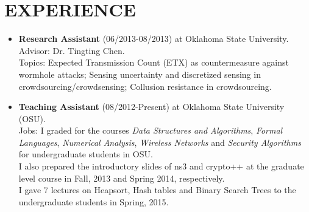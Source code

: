 \documentclass{article}
\begin{document}
\section{\uppercase{Experience}}
\begin{itemize}
\item {\bf Research Assistant} (06/2013-08/2013) at Oklahoma State University.\\
Advisor: Dr. Tingting Chen.\\
Topics: Expected Transmission Count (ETX) as countermeasure against wormhole attacks; Sensing uncertainty and discretized sensing in crowdsourcing/crowdsensing; Collusion resistance in crowdsourcing.
%
%
\item {\bf Teaching Assistant} (08/2012-Present) at Oklahoma State University (OSU).\\
Jobs: I graded for the courses {\it Data Structures and Algorithms}, {\it Formal Languages}, {\it Numerical Analysis}, {\it Wireless Networks} and {\it Security Algorithms} for undergraduate students in OSU. \\
I also prepared the introductory slides of ns3 and crypto++ at the graduate level course in Fall, 2013 and Spring 2014, respectively.\\
I gave 7 lectures on Heapsort, Hash tables and Binary Search Trees to the undergraduate students in Spring, 2015.


\end{itemize}
\end{document}
